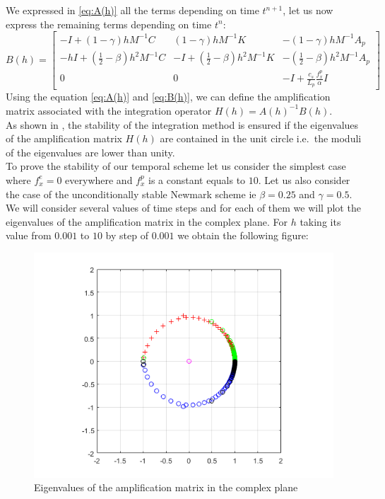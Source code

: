 We expressed in \ref{eq:A(h)} all the terms depending on time $t^{n+1}$, let us now express the remaining terms depending on time $t^n$:
\begin{equation}
    B(h) = \begin{bmatrix} -I+(1-\gamma) h M^{-1} C & (1-\gamma) h M^{-1} K & -(1-\gamma) h M^{-1} A_p \\
    -h I + (\frac{1}{2}-\beta) h^2 M^{-1} C & -I+(\frac{1}{2}-\beta) h^2 M^{-1} K & -(\frac{1}{2}-\beta) h^2 M^{-1} A_p\\
    0 & 0 & -I+\frac{c_s}{L_p}\frac{f^p_x}{\alpha} I
    \end{bmatrix}
    \label{eq:B(h)}
\end{equation}
Using the equation \ref{eq:A(h)} and \ref{eq:B(h)}, we can define the amplification matrix associated with the integration operator $H(h) = A(h)^{-1} B(h)$.\\
As shown in \cite{Geradin}, the stability of the integration method is ensured if the eigenvalues of the amplification matrix $H(h)$ are contained in the unit circle i.e.\ the moduli of the eigenvalues are lower than unity.\\ To prove the stability of our temporal scheme let us consider the simplest case where $f^e_x = 0$ everywhere and $f^p_x$ is a constant equals to $10$. Let us also consider the case of the unconditionally stable Newmark scheme ie $\beta = 0.25$ and $\gamma = 0.5$. We will consider several values of time steps and for each of them we will plot the eigenvalues of the amplification matrix in the complex plane. For $h$ taking its value from $0.001$ to $10$ by step of $0.001$ we obtain the following figure:
\begin{figure}[H]
    \centering
    \includegraphics[scale=0.6]{images/radius.png}
    \caption{Eigenvalues of the amplification matrix in the complex plane}
    \label{fig:eigenval_amp}
\end{figure}
